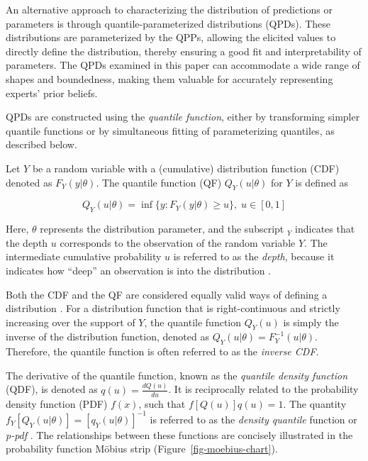 \documentclass[
  fleqn,
  deca,
  blindrev
]{informs4}
\begin{document}
An alternative approach to characterizing the distribution of
predictions or parameters is through quantile-parameterized
distributions (QPDs). These distributions are parameterized by the QPPs,
allowing the elicited values to directly define the distribution,
thereby ensuring a good fit and interpretability of parameters. The QPDs
examined in this paper can accommodate a wide range of shapes and
boundedness, making them valuable for accurately representing experts'
prior beliefs.

QPDs are constructed using the \emph{quantile function}, either by
transforming simpler quantile functions or by simultaneous fitting of
parameterizing quantiles, as described below.

Let \(Y\) be a random variable with a (cumulative) distribution function
(CDF) denoted as \(F_Y(y\vert\theta)\). The quantile function (QF)
\(Q_Y(u\vert\theta)\) for \(Y\) is defined as

\[
Q_Y(u\vert\theta)=\inf\{y:F_Y(y\vert\theta)\geq u\}, \; u\in[0,1]
\]

Here, \(\theta\) represents the distribution parameter, and the
subscript \(_Y\) indicates that the depth \(u\) corresponds to the
\textcolor[HTML]{ff0000}{observation of the} random variable \(Y\).
\textcolor[HTML]{ff0000}{The intermediate cumulative probability \(u\)
is referred to as the \emph{depth}, because it indicates how ``deep'' an
observation is into the distribution
\citep{perepolkin2023TenetsQuantilebasedInference}.}

Both the CDF and the QF are considered equally valid ways of defining a
distribution \citep{tukey1965WhichPartSample}. For a distribution
function that is right-continuous and strictly increasing over the
support of \(Y\), the quantile function \(Q_Y(u)\) is simply the inverse
of the distribution function, denoted as
\(Q_Y(u\vert\theta)=F_Y^{-1}(u\vert\theta)\). Therefore, the quantile
function is often referred to as the \emph{inverse CDF}.

The derivative of the quantile function, known as the \emph{quantile
density function} (QDF), is denoted as \(q(u) = \frac{dQ(u)}{du}\). It
is reciprocally related to the probability density function (PDF)
\(f(x)\), such that \(f[Q(u)]q(u) = 1\). The quantity
\(f_Y[Q_Y(u\vert\theta)]=[q_Y(u\vert\theta)]^{-1}\) is referred to as
the \emph{density quantile} function
\citep{parzen1979NonparametricStatisticalData} or \emph{p-pdf}
\citep{gilchrist2000StatisticalModellingQuantile}. The relationships
between these functions are concisely illustrated in the probability
function Möbius strip (Figure~\ref{fig-moebius-chart}).
\end{document}
